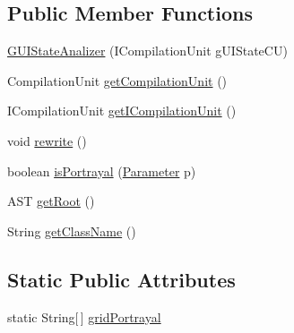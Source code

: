 \subsection*{Public Member Functions}
\begin{DoxyCompactItemize}
\item 
\hyperlink{classit_1_1isislab_1_1masonassisteddocumentation_1_1mason_1_1analizer_1_1_g_u_i_state_analizer_adc4cb38b3e2e24ef10cf0c54cdf9fd83}{G\-U\-I\-State\-Analizer} (I\-Compilation\-Unit g\-U\-I\-State\-C\-U)
\item 
Compilation\-Unit \hyperlink{classit_1_1isislab_1_1masonassisteddocumentation_1_1mason_1_1analizer_1_1_g_u_i_state_analizer_abcc411adb9c2a4cc078f037139bf2880}{get\-Compilation\-Unit} ()
\item 
I\-Compilation\-Unit \hyperlink{classit_1_1isislab_1_1masonassisteddocumentation_1_1mason_1_1analizer_1_1_g_u_i_state_analizer_a61458e87df0689c18f0ae9b28aacaf79}{get\-I\-Compilation\-Unit} ()
\item 
void \hyperlink{classit_1_1isislab_1_1masonassisteddocumentation_1_1mason_1_1analizer_1_1_g_u_i_state_analizer_a247ba9e4d8bcb9fe8266f0de15cae65f}{rewrite} ()
\item 
boolean \hyperlink{classit_1_1isislab_1_1masonassisteddocumentation_1_1mason_1_1analizer_1_1_g_u_i_state_analizer_a3463fa1af4b3f3ba0e8625d921f187fa}{is\-Portrayal} (\hyperlink{classit_1_1isislab_1_1masonassisteddocumentation_1_1mason_1_1analizer_1_1_parameter}{Parameter} p)
\item 
A\-S\-T \hyperlink{classit_1_1isislab_1_1masonassisteddocumentation_1_1mason_1_1analizer_1_1_g_u_i_state_analizer_ab85230ede776b3f7ca0043261bf74586}{get\-Root} ()
\item 
String \hyperlink{classit_1_1isislab_1_1masonassisteddocumentation_1_1mason_1_1analizer_1_1_g_u_i_state_analizer_a6805774a4d6ad1b6222b9c4a5aae2c0c}{get\-Class\-Name} ()
\end{DoxyCompactItemize}
\subsection*{Static Public Attributes}
\begin{DoxyCompactItemize}
\item 
static String\mbox{[}$\,$\mbox{]} \hyperlink{classit_1_1isislab_1_1masonassisteddocumentation_1_1mason_1_1analizer_1_1_g_u_i_state_analizer_a8115999619182e42482a6682bcae825e}{grid\-Portrayal}
\end{DoxyCompactItemize}
